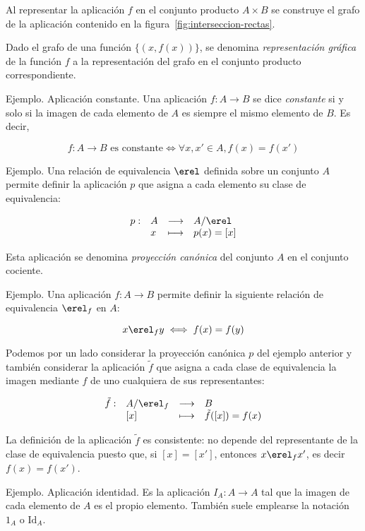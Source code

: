 Al representar la aplicación $f$ en el conjunto producto $A \times B$ se
construye el grafo de la aplicación contenido en la
figura~\ref{fig:interseccion-rectas}.

Dado el grafo de una función $\{(x, f(x))\}$, se denomina
\emph{representación gráfica} de la función $f$ a la representación del
grafo en el conjunto producto correspondiente.

Ejemplo. Aplicación constante. Una aplicación $f: A \longrightarrow B$ se
dice \emph{constante} si y solo si la imagen de cada elemento de $A$ es
siempre el mismo elemento de $B$. Es decir,

$$ f: A \longrightarrow B \text{ es constante} \iff \forall x, x' \in A,
f(x) = f(x') $$

Ejemplo. Una relación de equivalencia $\erel$ definida sobre un conjunto $A$
permite definir la aplicación $p$ que asigna a cada elemento su clase de
equivalencia:

$$
  \begin{array}{llll}
    p:  & A   &\longrightarrow  & A/\erel \\
        & x   &\longmapsto      & p(x) = [x]
  \end{array}
$$

\noindent Esta aplicación se denomina \emph{proyección canónica} del
conjunto $A$ en el conjunto cociente.

Ejemplo. Una aplicación $f: A \longrightarrow B$ permite definir la
siguiente relación de equivalencia $\erel_f$ en $A$:

$$ x \erel_f y \iff f(x) = f(y) $$

Podemos por un lado considerar la proyección canónica $p$ del ejemplo
anterior y también considerar la aplicación $\tilde{f}$ que asigna a cada
clase de equivalencia la imagen mediante $f$ de uno cualquiera de sus
representantes:

$$
  \begin{array}{llll}
    \tilde{f}:  & A/\erel_f & \longrightarrow & B \\
                & [x]       & \longmapsto     & \tilde{f}([x]) = f(x)
  \end{array}
$$

La definición de la aplicación $\tilde{f}$ es consistente: no depende del
representante de la clase de equivalencia puesto que, si $[x] = [x']$,
entonces $x \erel_f x'$, es decir $f(x) = f(x')$.

Ejemplo. Aplicación identidad. Es la aplicación $I_A: A \longrightarrow A$
tal que la imagen de cada elemento de $A$ es el propio elemento. También
suele emplearse la notación $1_A$ o $\text{Id}_A$.

